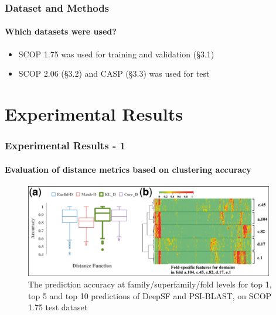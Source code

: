 \documentclass[xcolor={usenames,dvipsnames},hyperref={hyperindex,bookmarks}]{beamer}
\begin{document}
\frame
{
	\frametitle{Dataset and Methods}
	\framesubtitle{Which datasets were used?}

	\begin{itemize}
	\item SCOP 1.75 was used for training and validation (\S3.1)
	\item SCOP 2.06 (\S3.2) and CASP (\S3.3) was used for test
	\end{itemize}
}














\section{Experimental Results}



\frame
{
	\frametitle{Experimental Results - 1}
	\framesubtitle{Evaluation of distance metrics based on clustering accuracy}


	\begin{figure}[h]
	\centering 
	\includegraphics[height=1.6in]{./pics/distance-metrics}
	\caption{The prediction accuracy at family/superfamily/fold levels for top 1, top 5 and top 10 predictions of DeepSF and PSI-BLAST, on SCOP 1.75 test dataset}
	\label{fig:distancemetrics}
	\end{figure}
}
\end{document}
